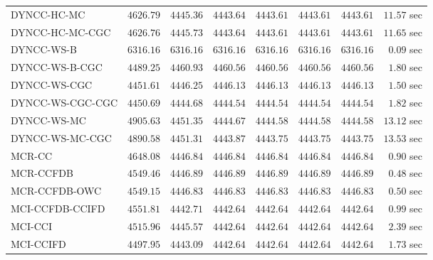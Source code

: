 \begin{table}[H]
\begin{tabular}{lrrrrrrr}
         DYNCC-HC-MC & $      4626.79$ & $      4445.36$ & $      4443.64$ & $      4443.61$ & $      4443.61$ & $      4443.61$ & $        11.57$ sec   \\ 
     DYNCC-HC-MC-CGC & $      4626.76$ & $      4445.73$ & $      4443.64$ & $      4443.61$ & $      4443.61$ & $      4443.61$ & $        11.65$ sec   \\ 
          DYNCC-WS-B & $      6316.16$ & $      6316.16$ & $      6316.16$ & $      6316.16$ & $      6316.16$ & $      6316.16$ & $         0.09$ sec   \\ 
      DYNCC-WS-B-CGC & $      4489.25$ & $      4460.93$ & $      4460.56$ & $      4460.56$ & $      4460.56$ & $      4460.56$ & $         1.80$ sec   \\ 
        DYNCC-WS-CGC & $      4451.61$ & $      4446.25$ & $      4446.13$ & $      4446.13$ & $      4446.13$ & $      4446.13$ & $         1.50$ sec   \\ 
    DYNCC-WS-CGC-CGC & $      4450.69$ & $      4444.68$ & $      4444.54$ & $      4444.54$ & $      4444.54$ & $      4444.54$ & $         1.82$ sec   \\ 
         DYNCC-WS-MC & $      4905.63$ & $      4451.35$ & $      4444.67$ & $      4444.58$ & $      4444.58$ & $      4444.58$ & $        13.12$ sec   \\ 
     DYNCC-WS-MC-CGC & $      4890.58$ & $      4451.31$ & $      4443.87$ & $      4443.75$ & $      4443.75$ & $      4443.75$ & $        13.53$ sec   \\ 
\cmidrule{1-1} 
              MCR-CC & $      4648.08$ & $      4446.84$ & $      4446.84$ & $      4446.84$ & $      4446.84$ & $      4446.84$ & $         0.90$ sec   \\ 
           MCR-CCFDB & $      4549.46$ & $      4446.89$ & $      4446.89$ & $      4446.89$ & $      4446.89$ & $      4446.89$ & $         0.48$ sec   \\ 
       MCR-CCFDB-OWC & $      4549.15$ & $      4446.83$ & $      4446.83$ & $      4446.83$ & $      4446.83$ & $      4446.83$ & $         0.50$ sec   \\ 
\cmidrule{1-1} 
     MCI-CCFDB-CCIFD & $      4551.81$ & $      4442.71$ & $      4442.64$ & $      4442.64$ & $      4442.64$ & $      4442.64$ & $         0.99$ sec   \\ 
             MCI-CCI & $      4515.96$ & $      4445.57$ & $      4442.64$ & $      4442.64$ & $      4442.64$ & $      4442.64$ & $         2.39$ sec   \\ 
           MCI-CCIFD & $      4497.95$ & $      4443.09$ & $      4442.64$ & $      4442.64$ & $      4442.64$ & $      4442.64$ & $         1.73$ sec   \\ 

\end{tabular}
\end{table}

